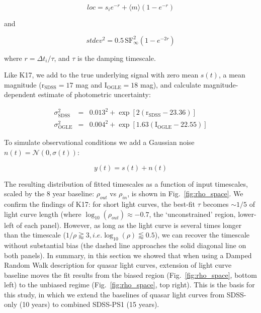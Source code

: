 \documentclass[twocolumn]{aastex62}
\begin{document}
\begin{equation}
loc = s_{i} e ^ { - r  }  + \langle m \rangle \left( 1 - e ^{ - r }\right)
\end{equation}

and 

\begin{equation}
stdev^{2} =  0.5  \, \mathrm{SF}_{\infty}^{2} \left( 1 - e ^{  - 2 r  }  \right)
\end{equation}

where  $r = \Delta t_{i} / \tau$, and $\tau$ is the damping timescale.


Like K17, we add to the true underlying signal with zero mean $s(t)$, a mean magnitude  ($\mathrm{r_{SDSS}}=17$ mag and $\mathrm{I_{OGLE}}=18$ mag), and calculate magnitude-dependent estimate of photometric uncertainty:

\begin{eqnarray}
\sigma_{\mathrm{SDSS}}^{2} &=& 0.013^{2} + \exp{[2 (\mathrm{r_{SDSS}}-23.36)]} \\
\sigma_{\mathrm{OGLE}}^{2} &=& 0.004^{2} + \exp{[1.63 (\mathrm{I_{OGLE}} - 22.55)]}
\end{eqnarray}

To simulate observational conditions  we add a Gaussian noise $n(t) = \mathcal{N}(0,\sigma(t))$:

\begin{equation}
y(t) = s(t) + n(t) 
\end{equation}

The resulting distribution of fitted timescales  as a function of input timescales, scaled by the  8 year baseline: $\rho_{out}$ vs $\rho_{in}$, is shown in Fig.~\ref{fig:rho_space}. We confirm the findings of K17: for short light curves, the best-fit $\tau$ becomes $\sim 1/5$ of light curve length (where $\log_{10}{(\rho_{out})} \approx -0.7$, the `unconstrained' region, lower-left of each panel). However, as long as the light curve is several times longer than the timescale ($1/\rho \gtrapprox 3, i.e. \log_{10}{(\rho)} \lessapprox 0.5$), we can recover the timescale without substantial bias (the dashed line approaches the solid diagonal line on both panels). In summary, in this section we showed that when using a Damped Random Walk description for quasar light curves, extension of light curve baseline moves the fit results from the biased region (Fig.~\ref{fig:rho_space}, bottom left) to the unbiased regime (Fig.~\ref{fig:rho_space}, top right). This is the basis for this study,  in which we extend the baselines of quasar light curves from SDSS-only (10 years) to combined SDSS-PS1 (15 years). 
\end{document}
